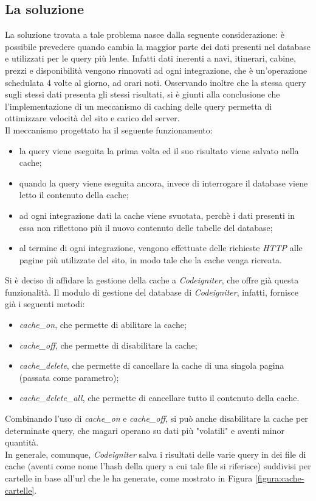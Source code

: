\subsection{La soluzione}
La soluzione trovata a tale problema nasce dalla seguente considerazione: è possibile prevedere quando cambia la maggior parte dei dati presenti nel database e utilizzati per le query più lente. Infatti dati inerenti a navi, itinerari, cabine, prezzi e disponibilità vengono rinnovati ad ogni integrazione, che è un'operazione schedulata 4 volte al giorno, ad orari noti. Osservando inoltre che la stessa query sugli stessi dati presenta gli stessi risultati, si è giunti alla conclusione che l'implementazione di un meccanismo di caching delle query permetta di ottimizzare velocità del sito e carico del server.\\
Il meccanismo progettato ha il seguente funzionamento:
\begin{itemize}
	\item la query viene eseguita la prima volta ed il suo risultato viene salvato nella cache;
	\item quando la query viene eseguita ancora, invece di interrogare il database viene letto il contenuto della cache;
	\item ad ogni integrazione dati la cache viene svuotata, perchè i dati presenti in essa non riflettono più il nuovo contenuto delle tabelle del database;
	\item al termine di ogni integrazione, vengono effettuate delle richieste \textit{HTTP} alle pagine più utilizzate del sito, in modo tale che la cache venga ricreata.
\end{itemize}
Si è deciso di affidare la gestione della cache a \textit{Codeigniter}, che offre già questa funzionalità. Il modulo di gestione del database di \textit{Codeigniter}, infatti, fornisce già i seguenti metodi:
\begin{itemize}
	\item \textit{cache\_on}, che permette di abilitare la cache;
	\item \textit{cache\_off}, che permette di disabilitare la cache;
	\item \textit{cache\_delete}, che permette di cancellare la cache di una singola pagina (passata come parametro);
	\item \textit{cache\_delete\_all}, che permette di cancellare tutto il contenuto della cache.
\end{itemize}
Combinando l'uso di \textit{cache\_on} e \textit{cache\_off}, si può anche disabilitare la cache per determinate query, che magari operano su dati più "volatili" e aventi minor quantità. \\In generale, comunque, \textit{Codeigniter} salva i risultati delle varie query in dei file di cache (aventi come nome l'hash della query a cui tale file si riferisce) suddivisi per cartelle in base all'url che le ha generate, come mostrato in Figura \ref{figura:cache-cartelle}.

